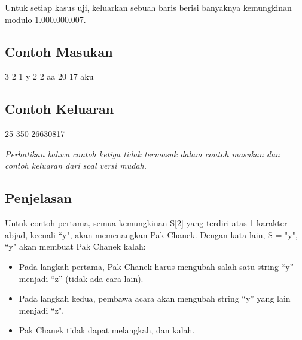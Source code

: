\documentclass[../main_problemset.tex]{subfiles} %
\begin{document}
Untuk setiap kasus uji, keluarkan sebuah baris berisi banyaknya kemungkinan modulo 1.000.000.007.

\vspace{.4cm}

\begin{minipage}[t]{0.5\textwidth}
\subsection*{Contoh Masukan}

\begin{lcverbatim}
3
2 1
y
2 2
aa
20 17
aku
\end{lcverbatim}
\end{minipage}
\begin{minipage}[t]{0.5\textwidth}
\subsection*{Contoh Keluaran}

\begin{lcverbatim}
25
350
26630817
\end{lcverbatim}
\end{minipage}

\textit{Perhatikan bahwa contoh ketiga tidak termasuk dalam contoh masukan dan contoh keluaran dari soal versi mudah.}

\subsection*{Penjelasan}

Untuk contoh pertama, semua kemungkinan S[2] yang terdiri atas 1 karakter abjad, kecuali ``y", akan memenangkan Pak Chanek. Dengan kata lain, S = {"y", ``y"} akan membuat Pak Chanek kalah:

\begin{itemize}
	\item Pada langkah pertama, Pak Chanek harus mengubah salah satu string ``y'' menjadi ``z'' (tidak ada cara lain).
	\item Pada langkah kedua, pembawa acara akan mengubah string ``y'' yang lain menjadi ``z".
	\item Pak Chanek tidak dapat melangkah, dan kalah.
\end{itemize}
\end{document}
